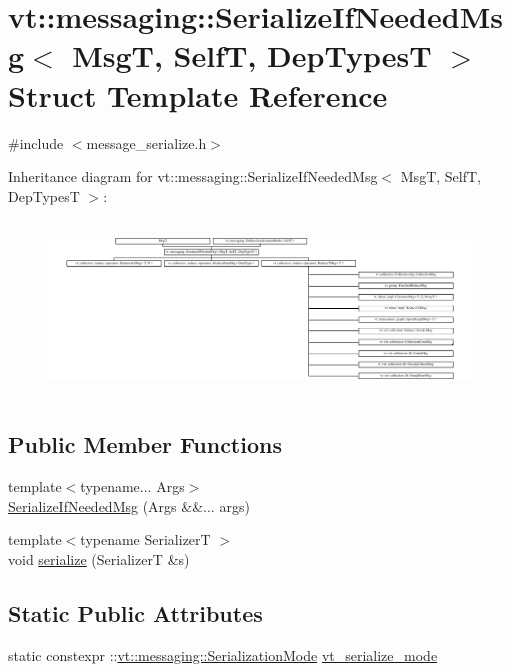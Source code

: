 \hypertarget{structvt_1_1messaging_1_1_serialize_if_needed_msg}{}\section{vt\+:\+:messaging\+:\+:Serialize\+If\+Needed\+Msg$<$ MsgT, SelfT, Dep\+TypesT $>$ Struct Template Reference}
\label{structvt_1_1messaging_1_1_serialize_if_needed_msg}


{\ttfamily \#include $<$message\+\_\+serialize.\+h$>$}

Inheritance diagram for vt\+:\+:messaging\+:\+:Serialize\+If\+Needed\+Msg$<$ MsgT, SelfT, Dep\+TypesT $>$\+:\begin{figure}[H]
\begin{center}
\leavevmode
\includegraphics[height=4.654731cm]{structvt_1_1messaging_1_1_serialize_if_needed_msg}
\end{center}
\end{figure}
\subsection*{Public Member Functions}
\begin{DoxyCompactItemize}
\item 
{\footnotesize template$<$typename... Args$>$ }\\\hyperlink{structvt_1_1messaging_1_1_serialize_if_needed_msg_aeca13b16b58fca6e1987d5d19d57b3b8}{Serialize\+If\+Needed\+Msg} (Args \&\&... args)
\item 
{\footnotesize template$<$typename SerializerT $>$ }\\void \hyperlink{structvt_1_1messaging_1_1_serialize_if_needed_msg_acaf8965385e80bbbaabc8d335fe90eed}{serialize} (SerializerT \&s)
\end{DoxyCompactItemize}
\subsection*{Static Public Attributes}
\begin{DoxyCompactItemize}
\item 
static constexpr \+::\hyperlink{namespacevt_1_1messaging_a436c5b9fc7f591e5978a136999cb9ef8}{vt\+::messaging\+::\+Serialization\+Mode} \hyperlink{structvt_1_1messaging_1_1_serialize_if_needed_msg_aae6c39c834f1aa059dadd77324ca750b}{vt\+\_\+serialize\+\_\+mode}
\end{DoxyCompactItemize}


